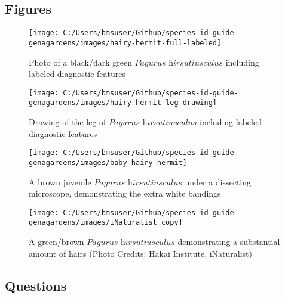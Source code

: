 \documentclass[
]{article}
\begin{document}
\newpage

\hypertarget{figures}{%
\subsection{Figures}\label{figures}}

\begin{figure}

\texttt{[image: C:/Users/bmsuser/Github/species-id-guide-genagardens/images/hairy-hermit-full-labeled]} \hfill{}

\caption{Photo of a black/dark green $\textit{Pagurus hirsutiusculus}$ including labeled diagnostic features}\label{fig:hairy-hermit}
\end{figure}

\begin{figure}

\texttt{[image: C:/Users/bmsuser/Github/species-id-guide-genagardens/images/hairy-hermit-leg-drawing]} \hfill{}

\caption{Drawing of the leg of $\textit{Pagurus hirsutiusculus}$ including labeled diagnostic features}\label{fig:hairy-hermit-leg}
\end{figure}

\begin{figure}

\texttt{[image: C:/Users/bmsuser/Github/species-id-guide-genagardens/images/baby-hairy-hermit]} \hfill{}

\caption{A brown juvenile $\textit{Pagurus hirsutiusculus}$ under a dissecting microscope, demonstrating the extra white bandings}\label{fig:hairy-hermit-juvenile}
\end{figure}

\begin{figure}

\texttt{[image: C:/Users/bmsuser/Github/species-id-guide-genagardens/images/iNaturalist copy]} \hfill{}

\caption{A green/brown $\textit{Pagurus hirsutiusculus}$ demonstrating a substantial amount of hairs (Photo Credits: Hakai Institute, iNaturalist)}\label{fig:hair-hermit-very-hairy}
\end{figure}

\newpage

\hypertarget{questions}{%
\subsection{Questions}\label{questions}}
\end{document}
